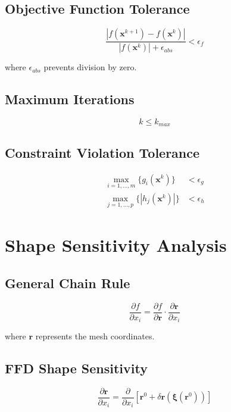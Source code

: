 \documentclass{article}
\begin{document}
\subsection{Objective Function Tolerance}
\begin{equation}
\frac{|f(\mathbf{x}^{k+1}) - f(\mathbf{x}^k)|}{|f(\mathbf{x}^k)| + \epsilon_{abs}} < \epsilon_f
\end{equation}

where $\epsilon_{abs}$ prevents division by zero.

\subsection{Maximum Iterations}
\begin{equation}
k \leq k_{max}
\end{equation}

\subsection{Constraint Violation Tolerance}
\begin{align}
\max_{i=1,\ldots,m} \{g_i(\mathbf{x}^k)\} &< \epsilon_g \\
\max_{j=1,\ldots,p} \{|h_j(\mathbf{x}^k)|\} &< \epsilon_h
\end{align}

\section{Shape Sensitivity Analysis}

\subsection{General Chain Rule}
\begin{equation}
\frac{\partial f}{\partial x_i} = \frac{\partial f}{\partial \mathbf{r}} \cdot \frac{\partial \mathbf{r}}{\partial x_i}
\end{equation}

where $\mathbf{r}$ represents the mesh coordinates.

\subsection{FFD Shape Sensitivity}
\begin{equation}
\frac{\partial \mathbf{r}}{\partial x_i} = \frac{\partial}{\partial x_i}\left[\mathbf{r}^0 + \delta \mathbf{r}(\boldsymbol{\xi}(\mathbf{r}^0))\right]
\end{equation}
\end{document}

